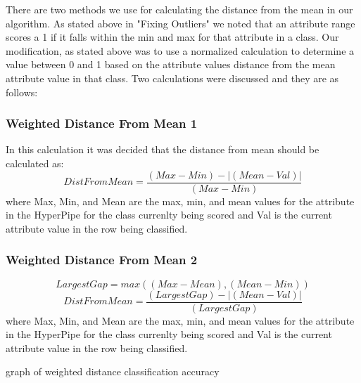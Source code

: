 There are two methods we use for calculating the distance from 
the mean in our algorithm. As stated above in "Fixing Outliers" 
we noted that an attribute range scores a 1 if it falls within 
the min and max for that attribute in a class. Our modification, 
as stated above was to use a normalized calculation to determine 
a value between 0 and 1 based on the attribute values distance 
from the mean attribute value in that class. Two calculations 
were discussed and they are as follows:
\subsubsection{Weighted Distance From Mean 1}
In this calculation it was decided that the distance from mean 
should be calculated as:
\begin{equation}
  DistFromMean=\frac{(Max-Min)-|(Mean-Val)|}{(Max-Min)}
\end{equation}
where Max, Min, and Mean are the max, min, and mean values for 
the attribute in the HyperPipe for the class currenlty being 
scored and Val is the current attribute value in the row being 
classified.
\subsubsection{Weighted Distance From Mean 2}
\begin{equation}
  LargestGap = max((Max-Mean),(Mean-Min))
\end{equation}
\begin{equation}
  DistFromMean=\frac{(LargestGap)-|(Mean-Val)|}{(LargestGap)}
\end{equation}
where Max, Min, and Mean are the max, min, and mean values for 
the attribute in the HyperPipe for the class currenlty being 
scored and Val is the current attribute value in the row being 
classified.



graph of weighted distance classification accuracy

